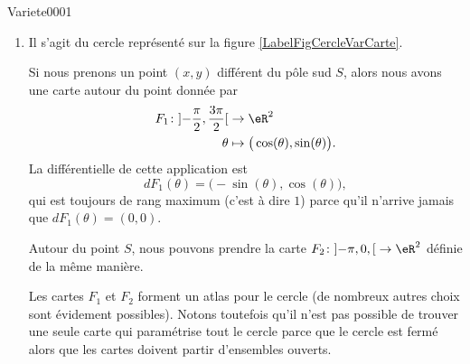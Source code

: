 
\begin{corrige}{Variete0001}

	\begin{enumerate}

		\item
			Il s'agit du cercle représenté sur la figure \ref{LabelFigCercleVarCarte}.
			\newcommand{\CaptionFigCercleVarCarte}{On ne peut pas trouver un atlas d'une seule carte pour le cerlce.}
			
			Si nous prenons un point $(x,y)$ différent du pôle sud $S$, alors nous avons une carte autour du point donnée par
			\begin{equation}
				\begin{aligned}
					F_1\colon \mathopen] -\frac{ \pi }{2} , \frac{ 3\pi }{ 2 } \mathclose[&\to \eR^2 \\
					\theta&\mapsto \big( \cos(\theta),\sin(\theta) \big).
				\end{aligned}
			\end{equation}
			La différentielle de cette application est
			\begin{equation}
				dF_1(\theta)=\big( -\sin(\theta),\cos(\theta) \big),
			\end{equation}
			qui est toujours de rang maximum (c'est à dire $1$) parce qu'il n'arrive jamais que $dF_1(\theta)=(0,0)$.

			Autour du point $S$, nous pouvons prendre la carte $F_2\colon \mathopen] -\pi,0 ,  \mathclose[\to \eR^2$ définie de la même manière.
			
			Les cartes $F_1$ et $F_2$ forment un atlas pour le cercle (de nombreux autres choix sont évidement possibles). Notons toutefois qu'il n'est pas possible de trouver une seule carte qui paramétrise tout le cercle parce que le cercle est fermé alors que les cartes doivent partir d'ensembles ouverts.


\end{enumerate}
\end{corrige}
